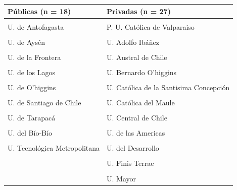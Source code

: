 \documentclass[
  spanish,
  a4paper,
  oneside]{scrbook}
\begin{document}
\begin{table}
{\begin{threeparttable}
\begin{tabular}[t]{>{\raggedright\arraybackslash}p{7cm}>{\raggedright\arraybackslash}p{7cm}}
\toprule
\textbf{Públicas (n = 18)} & \textbf{Privadas (n = 27)}\\
\midrule
\cellcolor{gray!10}{U. Arturo Prat} & \cellcolor{gray!10}{P. U. Católica de Chile}\\
U. de Antofagasta & P. U. Católica de Valparaiso\\
\cellcolor{gray!10}{U. de Atacama} & \cellcolor{gray!10}{U. Academia de Humanismo Cristiano}\\
U. de Aysén & U. Adolfo Ibáñez\\
\cellcolor{gray!10}{U. de Chile} & \cellcolor{gray!10}{U. Alberto Hurtado}\\
\addlinespace
U. de la Frontera & U. Austral de Chile\\
\cellcolor{gray!10}{U. de la Serena} & \cellcolor{gray!10}{U. Autonoma de Chile}\\
U. de los Lagos & U. Bernardo O'higgins\\
\cellcolor{gray!10}{U. de Magallanes} & \cellcolor{gray!10}{U. Católica Cardenal Silva Henríquez}\\
U. de O'higgins & U. Católica de la Santisima Concepción\\
\addlinespace
\cellcolor{gray!10}{U. de Playa Ancha de Ciencias de la Educación} & \cellcolor{gray!10}{U. Católica de Temuco}\\
U. de Santiago de Chile & U. Católica del Maule\\
\cellcolor{gray!10}{U. de Talca} & \cellcolor{gray!10}{U. Católica del Norte}\\
U. de Tarapacá & U. Central de Chile\\
\cellcolor{gray!10}{U. de Valparaiso} & \cellcolor{gray!10}{U. de Concepción}\\
\addlinespace
U. del Bío-Bío & U. de las Americas\\
\cellcolor{gray!10}{U. Metropolitana de Ciencias de la Educación} & \cellcolor{gray!10}{U. de los Andes}\\
U. Tecnológica Metropolitana & U. del Desarrollo\\
\cellcolor{gray!10}{} & \cellcolor{gray!10}{U. Diego Portales}\\
 & U. Finis Terrae\\
\addlinespace
\cellcolor{gray!10}{} & \cellcolor{gray!10}{U. Gabriela Mistral}\\
 & U. Mayor\\

\end{tabular}
\end{threeparttable}}
\end{table}
\end{document}

